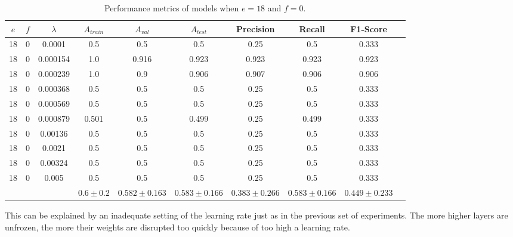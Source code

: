 \begin{table}[ht]
\centering
\begin{tabular}{ |c|c|c|c|c|c|c|c|c|c| }
\hline
$e$ & $f$ & $\lambda$ & $A_{train}$ & $A_{val}$ & $A_{test}$ & Precision & Recall & F1-Score \\
\hline
18 & 0 & 0.0001 & 0.5 & 0.5 & 0.5 & 0.25 & 0.5 & 0.333 \\
18 & 0 & 0.000154 & 1.0 & 0.916 & 0.923 & 0.923 & 0.923 & 0.923 \\
18 & 0 & 0.000239 & 1.0 & 0.9 & 0.906 & 0.907 & 0.906 & 0.906 \\
18 & 0 & 0.000368 & 0.5 & 0.5 & 0.5 & 0.25 & 0.5 & 0.333 \\
18 & 0 & 0.000569 & 0.5 & 0.5 & 0.5 & 0.25 & 0.5 & 0.333 \\
18 & 0 & 0.000879 & 0.501 & 0.5 & 0.499 & 0.25 & 0.499 & 0.333 \\
18 & 0 & 0.00136 & 0.5 & 0.5 & 0.5 & 0.25 & 0.5 & 0.333 \\
18 & 0 & 0.0021 & 0.5 & 0.5 & 0.5 & 0.25 & 0.5 & 0.333 \\
18 & 0 & 0.00324 & 0.5 & 0.5 & 0.5 & 0.25 & 0.5 & 0.333 \\
18 & 0 & 0.005 & 0.5 & 0.5 & 0.5 & 0.25 & 0.5 & 0.333 \\
\hline
 & & & $0.6\pm0.2$ & $0.582\pm0.163$ & $0.583\pm0.166$ & $0.383\pm0.266$ & $0.583\pm0.166$ & $0.449\pm0.233$ \\
\hline
\end{tabular}
\caption{Performance metrics of models when $e = 18$ and $f = 0$.}
\label{table:vgg16_finetuning_0}
\end{table}

This can be explained by an inadequate setting of the learning rate just as in the previous set of experiments. The more higher layers are unfrozen, the more their weights are disrupted too quickly because of too high a learning rate.



